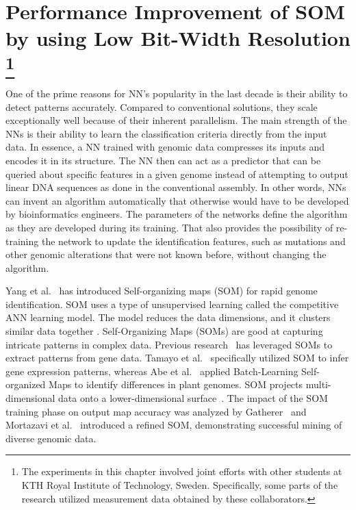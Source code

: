 \graphicspath{{./Ch5-SOM/images/}}

\chapter[Performance Improvement of SOM by using Low Bit-Width Resolution]{Performance Improvement of SOM by using Low Bit-Width Resolution \footnote{The experiments in this chapter involved joint efforts with other students at KTH Royal Institute of Technology, Sweden. Specifically, some parts of the research utilized measurement data obtained by these collaborators.}} 
\label{chap:SOM}
One of the prime reasons for NN's popularity in the last decade is their ability to detect patterns accurately. Compared to conventional solutions, they scale exceptionally well because of their inherent parallelism. The main strength of the NNs is their ability to learn the classification criteria directly from the input data. In essence, a NN trained with genomic data compresses its inputs and encodes it in its structure. The NN then can act as a predictor that can be queried about specific features in a given genome instead of attempting to output linear DNA sequences as done in the conventional assembly. In other words, NNs can invent an algorithm automatically that otherwise would have to be developed by bioinformatics engineers. The parameters of the networks define the algorithm as they are developed during its training. That also provides the possibility of re-training the network to update the identification features, such as mutations and other genomic alterations that were not known before, without changing the algorithm.

Yang et al.~\cite{Yang2018RiBoSOM} has introduced Self-organizing maps (SOM) for rapid genome identification. SOM uses a type of unsupervised learning called the competitive ANN learning model. The model reduces the data dimensions, and it clusters similar data together \cite{Kohonen2013}. Self-Organizing Maps (SOMs) are good at capturing intricate patterns in complex data. Previous research~\cite{tamayo1999interpreting, abe2009novel, mortazavi2013integrating, kohonen1990self, gatherer2007genome} has leveraged SOMs to extract patterns from gene data. Tamayo et al.~\cite{tamayo1999interpreting} specifically utilized SOM to infer gene expression patterns, whereas Abe et al.~\cite{abe2009novel} applied Batch-Learning Self-organized Maps to identify differences in plant genomes. SOM projects multi-dimensional data onto a lower-dimensional surface~\cite{kohonen1990self}. The impact of the SOM training phase on output map accuracy was analyzed by Gatherer~\cite{gatherer2007genome} and Mortazavi et al.~\cite{mortazavi2013integrating} introduced a refined SOM, demonstrating successful mining of diverse genomic data.

